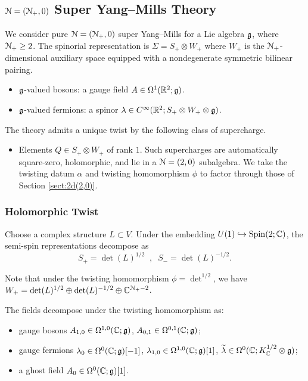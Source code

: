 \documentclass[10pt, oneside]{article}
\begin{document}
\subsection{\texorpdfstring{$\mathcal N=(\mathcal N_+,0)$}{N=(N+,0)} Super Yang--Mills Theory}

We consider pure $\mathcal N=(\mathcal N_+,0)$ super Yang--Mills for a Lie algebra $\mathfrak g$, where $\mathcal N_+ \geq 2$.
The spinorial representation is $\Sigma = S_+ \otimes W_+$ where $W_+$ is the $\mathcal N_+$-dimensional auxiliary space equipped with a nondegenerate symmetric bilinear pairing.

\begin{itemize}
\item $\mathfrak g$-valued bosons: a gauge field $A \in \Omega^1(\mathbb R^2;\mathfrak g)$.
\item $\mathfrak g$-valued fermions: a spinor $\lambda \in C^\infty(\mathbb R^2 ; S_+ \otimes W_+ \otimes \mathfrak g)$. 
\end{itemize}

The theory admits a unique twist by the following class of supercharge.
\begin{itemize}
\item Elements $Q \in S_+ \otimes W_+$ of rank $1$. 
Such supercharges are automatically square-zero, holomorphic, and lie in a $\mathcal N = (2,0)$ subalgebra.
We take the twisting datum $\alpha$ and twisting homomorphism $\phi$ to factor through those of Section \ref{sect:2d(2,0)}.
\end{itemize}

\subsubsection{Holomorphic Twist} \label{sect:2dN0minimaltwist}

Choose a complex structure $L \subset V$. 
Under the embedding $U(1) \hookrightarrow \mathrm{Spin}(2;\mathbb C)$, the semi-spin representations decompose as
\[
S_+ = \det(L)^{1/2} \;\; , \;\; S_- = \det(L)^{-1/2} .
\]

Note that under the twisting homomorphism $\phi = \det^{1/2}$, we have $W_+ = \det(L)^{1/2} \oplus \det(L)^{-1/2} \oplus \mathbb C^{\mathcal N_+ - 2}$.

The fields decompose under the twisting homomorphism as:
\begin{itemize}
\item gauge bosons $A_{1,0} \in \Omega^{1,0}(\mathbb C ; \mathfrak g)$, $A_{0,1} \in \Omega^{0,1}(\mathbb C ; \mathfrak g)$;
\item gauge fermions $\lambda_0 \in \Omega^0(\mathbb C ; \mathfrak g)[-1]$, $\lambda_{1,0} \in \Omega^{1,0}(\mathbb C ; \mathfrak g) [1]$, $\widetilde{\lambda} \in \Omega^{0} (\mathbb C ; K^{1/2}_\mathbb C \otimes \mathfrak g)$;
\item a ghost field $A_0 \in \Omega^0(\mathbb C ; \mathfrak g)[1]$.
\end{itemize}
\end{document}
